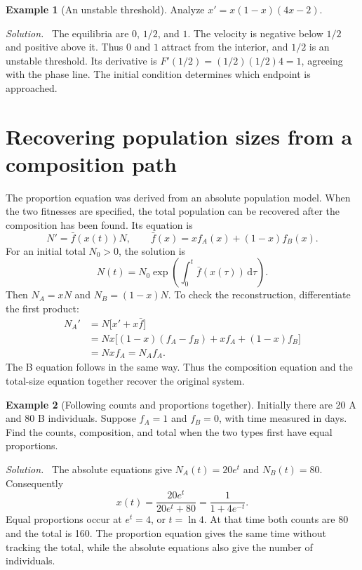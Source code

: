 \documentclass[11pt,oneside,openany]{book}
\theoremstyle{definition}
\newtheorem{example}{Example}[chapter]
\theoremstyle{remark}
\newenvironment{solution}{\par\smallskip\noindent\textit{Solution.}\ }{\par\smallskip}
\newcommand{\dd}{\,\mathrm{d}}
\numberwithin{equation}{chapter}
\begin{document}
\begin{example}[An unstable threshold]
Analyze $x'=x(1-x)(4x-2)$.
\begin{solution}
The equilibria are $0$, $1/2$, and $1$. The velocity is negative below $1/2$ and positive above it. Thus $0$ and $1$ attract from the interior, and $1/2$ is an unstable threshold. Its derivative is $F'(1/2)=(1/2)(1/2)4=1$, agreeing with the phase line. The initial condition determines which endpoint is approached.
\end{solution}
\end{example}

\section{Recovering population sizes from a composition path}
The proportion equation was derived from an absolute population model. When the two fitnesses are specified, the total population can be recovered after the composition has been found. Its equation is
\[
N'=\bar f(x(t))N,\qquad
\bar f(x)=xf_A(x)+(1-x)f_B(x).
\]
For an initial total $N_0>0$, the solution is
\[
N(t)=N_0\exp\left(\int_0^t\bar f(x(\tau))\dd\tau\right).
\]
Then $N_A=xN$ and $N_B=(1-x)N$. To check the reconstruction, differentiate the first product:
\begin{align*}
N_A'&=N\bigl[x'+x\bar f\bigr]\\
&=Nx\bigl[(1-x)(f_A-f_B)+xf_A+(1-x)f_B\bigr]\\
&=Nx f_A=N_Af_A.
\end{align*}
The B equation follows in the same way. Thus the composition equation and the total-size equation together recover the original system.

\begin{example}[Following counts and proportions together]
Initially there are 20 A and 80 B individuals. Suppose $f_A=1$ and $f_B=0$, with time measured in days. Find the counts, composition, and total when the two types first have equal proportions.
\begin{solution}
The absolute equations give $N_A(t)=20e^t$ and $N_B(t)=80$. Consequently
\[
x(t)=\frac{20e^t}{20e^t+80}=\frac1{1+4e^{-t}}.
\]
Equal proportions occur at $e^t=4$, or $t=\ln4$. At that time both counts are 80 and the total is 160. The proportion equation gives the same time without tracking the total, while the absolute equations also give the number of individuals.
\end{solution}
\end{example}
\end{document}
